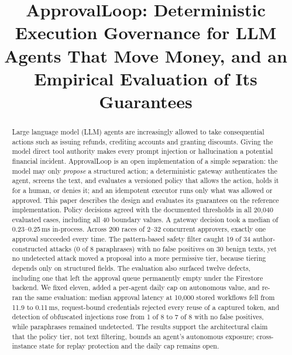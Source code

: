 \documentclass[conference]{IEEEtran}
\begin{document}
\title{ApprovalLoop: Deterministic Execution Governance for LLM Agents That Move Money, and an Empirical Evaluation of Its Guarantees}

\author{
}

\maketitle

\begin{abstract}
Large language model (LLM) agents are increasingly allowed to take consequential actions such as issuing refunds, crediting accounts and granting discounts. Giving the model direct tool authority makes every prompt injection or hallucination a potential financial incident. ApprovalLoop is an open implementation of a simple separation: the model may only \emph{propose} a structured action; a deterministic gateway authenticates the agent, screens the text, and evaluates a versioned policy that allows the action, holds it for a human, or denies it; and an idempotent executor runs only what was allowed or approved. This paper describes the design and evaluates its guarantees on the reference implementation. Policy decisions agreed with the documented thresholds in all 20{,}040 evaluated cases, including all 40 boundary values. A gateway decision took a median of 0.23--0.25\,ms in-process. Across 200 races of 2--32 concurrent approvers, exactly one approval succeeded every time. The pattern-based safety filter caught 19 of 34 author-constructed attacks (0 of 8 paraphrases) with no false positives on 30 benign texts, yet no undetected attack moved a proposal into a more permissive tier, because tiering depends only on structured fields. The evaluation also surfaced twelve defects, including one that left the approval queue permanently empty under the Firestore backend. We fixed eleven, added a per-agent daily cap on autonomous value, and re-ran the same evaluation: median approval latency at 10{,}000 stored workflows fell from 11.9 to 0.11\,ms, request-bound credentials rejected every reuse of a captured token, and detection of obfuscated injections rose from 1 of 8 to 7 of 8 with no false positives, while paraphrases remained undetected. The results support the architectural claim that the policy tier, not text filtering, bounds an agent's autonomous exposure; cross-instance state for replay protection and the daily cap remains open.
\end{abstract}
\end{document}
